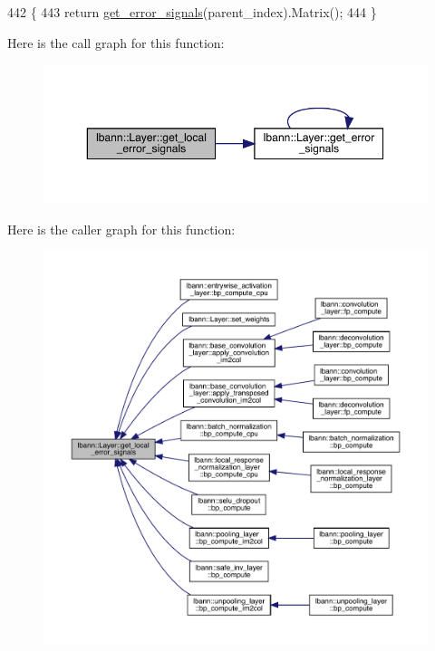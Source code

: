 \begin{DoxyCode}
442                                                     \{
443   \textcolor{keywordflow}{return} \hyperlink{classlbann_1_1Layer_adb561e140e0bb601f3c5a8ee053a71d2}{get\_error\_signals}(parent\_index).Matrix();
444 \}
\end{DoxyCode}
Here is the call graph for this function\+:\nopagebreak
\begin{figure}[H]
\begin{center}
\leavevmode
\includegraphics[width=350pt]{classlbann_1_1Layer_af178d00b9d878aa7d87754bff2a91f3a_cgraph}
\end{center}
\end{figure}
Here is the caller graph for this function\+:\nopagebreak
\begin{figure}[H]
\begin{center}
\leavevmode
\includegraphics[width=350pt]{classlbann_1_1Layer_af178d00b9d878aa7d87754bff2a91f3a_icgraph}
\end{center}
\end{figure}
\mbox{\label{classlbann_1_1Layer_acf76bc7fba1e8ab74947ef83a3c8a141}} 
